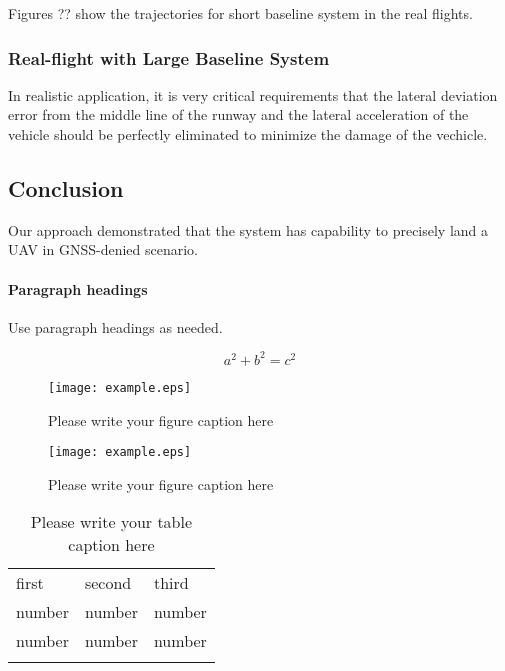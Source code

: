 Figures ?? show the trajectories for short baseline system in the real flights.



\subsubsection{Real-flight with Large Baseline System}


In realistic application, it is very critical requirements that the lateral deviation error from the middle line of the runway and the lateral acceleration of the vehicle should be perfectly eliminated to minimize the damage of the vechicle.



\subsection{Conclusion}


Our approach demonstrated that the system has capability to precisely land a UAV in GNSS-denied scenario.



\paragraph{Paragraph headings} Use paragraph headings as needed.

\begin{equation}
a^2+b^2=c^2
\end{equation}

\begin{figure}
  \texttt{[image: example.eps]}
\caption{Please write your figure caption here}
\label{fig:1}       %
\end{figure}
%
\begin{figure*}
\texttt{[image: example.eps]}
\caption{Please write your figure caption here}
\label{fig:2}       %
\end{figure*}
%
\begin{table}
\caption{Please write your table caption here}
\label{tab:1}       %
\begin{tabular}{lll}
\hline\noalign{\smallskip}
first & second & third  \\
\noalign{\smallskip}\hline\noalign{\smallskip}
number & number & number \\
number & number & number \\
\noalign{\smallskip}\hline
\end{tabular}
\end{table}



